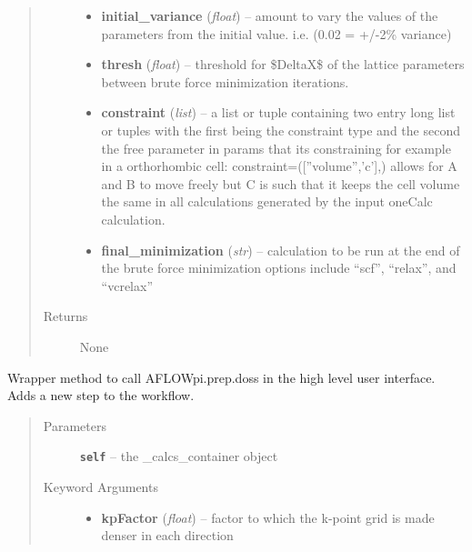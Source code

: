 \documentclass[letterpaper,10pt,english]{sphinxmanual}
\begin{document}
\begin{fulllineitems}
\begin{fulllineitems}
\begin{quote}
\begin{description}
\begin{itemize}
\item {} 
\textbf{initial\_variance} (\emph{float}) --
amount to vary the values of the parameters from the initial
value. i.e. (0.02 = +/-2\% variance)

\item {} 
\textbf{thresh} (\emph{float}) --
threshold for \$DeltaX\$ of the lattice parameters between brute force
minimization iterations.

\item {} 
\textbf{constraint} (\emph{list}) --
a list or tuple containing two entry long list or tuples with
the first being the constraint type and the second the free
parameter in params that its constraining for example in a
orthorhombic cell: constraint=({[}''volume'','c'{]},) allows for A and B
to move freely but C is such that it keeps the cell volume the same
in all calculations generated by the input oneCalc calculation.

\item {} 
\textbf{final\_minimization} (\emph{str}) --
calculation to be run at the end of the brute force minimization
options include ``scf'', ``relax'', and ``vcrelax''

\end{itemize}

\item[{Returns}] \leavevmode
None

\end{description}\end{quote}

\end{fulllineitems}


\begin{fulllineitems}
\label{prep:prep.calcs_container.dos}
Wrapper method to call AFLOWpi.prep.doss in the high level user interface.
Adds a new step to the workflow.
\begin{quote}\begin{description}
\item[{Parameters}] \leavevmode
\textbf{\texttt{self}} -- the \_calcs\_container object

\item[{Keyword Arguments}] \leavevmode\begin{itemize}
\item {} 
\textbf{kpFactor} (\emph{float}) --
factor to which the k-point grid is made denser in each direction


\end{itemize}
\end{description}
\end{quote}
\end{fulllineitems}
\end{fulllineitems}
\end{document}
